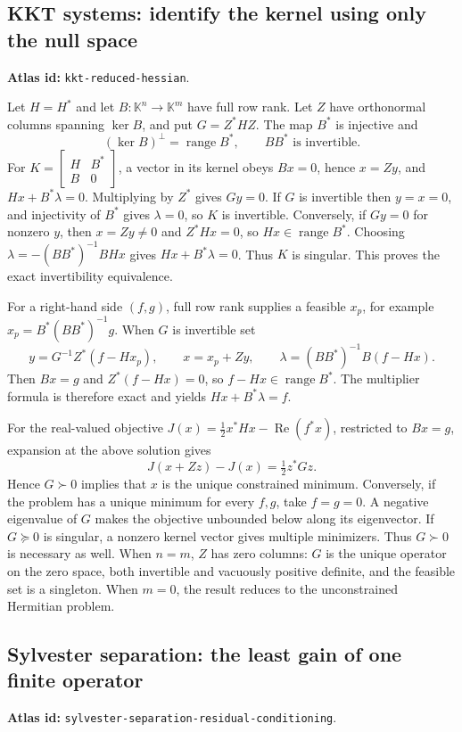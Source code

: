 \documentclass[11pt,a4paper]{article}
\DeclareRobustCommand{\code}[1]{{\footnotesize\urlstyle{tt}\nolinkurl{#1}}}
\begin{document}
\subsection{KKT systems: identify the kernel using only the null space}
\label{sec:eq-kkt}
\textbf{Atlas id:} \code{kkt-reduced-hessian}.

Let $H=H^*$ and let $B:\mathbb K^n\to\mathbb K^m$ have full row
rank. Let $Z$ have orthonormal columns spanning $\ker B$, and put
$G=Z^*HZ$. The map $B^*$ is injective and
\[
 (\ker B)^\perp=\operatorname{range}B^*,\qquad BB^*\text{ is invertible}.
\]
For $K=\begin{bmatrix}H&B^*\\B&0\end{bmatrix}$, a vector in its
kernel obeys $Bx=0$, hence $x=Zy$, and
$Hx+B^*\lambda=0$. Multiplying by $Z^*$ gives $Gy=0$.
If $G$ is invertible then $y=x=0$, and injectivity of $B^*$ gives
$\lambda=0$, so $K$ is invertible.
Conversely, if $Gy=0$ for nonzero $y$, then $x=Zy\ne0$ and
$Z^*Hx=0$, so $Hx\in\operatorname{range}B^*$. Choosing
$\lambda=-(BB^*)^{-1}BHx$ gives $Hx+B^*\lambda=0$.
Thus $K$ is singular. This proves the exact invertibility equivalence.

For a right-hand side $(f,g)$, full row rank supplies a feasible
$x_p$, for example $x_p=B^*(BB^*)^{-1}g$. When $G$ is invertible set
\[
 y=G^{-1}Z^*(f-Hx_p),\qquad
 x=x_p+Zy,\qquad
 \lambda=(BB^*)^{-1}B(f-Hx).
\]
Then $Bx=g$ and $Z^*(f-Hx)=0$, so $f-Hx\in\operatorname{range}B^*$.
The multiplier formula is therefore exact and yields
$Hx+B^*\lambda=f$.

For the real-valued objective
$J(x)=\tfrac12x^*Hx-\operatorname{Re}(f^*x)$, restricted to $Bx=g$,
expansion at the above solution gives
\[
 J(x+Zz)-J(x)=\tfrac12 z^*Gz.
\]
Hence $G\succ0$ implies that $x$ is the unique constrained minimum.
Conversely, if the problem has a unique minimum for every $f,g$, take
$f=g=0$. A negative eigenvalue of $G$ makes the objective unbounded
below along its eigenvector. If $G\succeq0$ is singular, a nonzero
kernel vector gives multiple minimizers. Thus $G\succ0$ is necessary
as well. When $n=m$, $Z$ has zero columns: $G$ is the unique operator
on the zero space, both invertible and vacuously positive definite,
and the feasible set is a singleton. When $m=0$, the result reduces to
the unconstrained Hermitian problem.

\subsection{Sylvester separation: the least gain of one finite operator}
\label{sec:eq-separation}
\textbf{Atlas id:} \code{sylvester-separation-residual-conditioning}.
\end{document}
